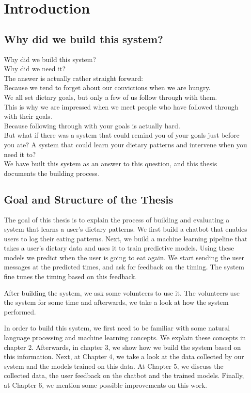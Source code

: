 
\chapter{Introduction}\label{chapter:introduction}

\section{Why did we build this system?}
Why did we build this system?\\ 
Why did we need it?\\
The answer is actually rather straight forward:\\
Because we tend to forget about our convictions when we are hungry.\\
We all set dietary goals, but only a few of us follow through with them.\\
This is why we are impressed when we meet people who have followed through with their goals.\\
Because following through with your goals is actually hard.\\
But what if there was a system that could remind you of your goals just before you ate?
A system that could learn your dietary patterns and intervene when you need it to?\\
We have built this system as an answer to this question, and this thesis documents the building process.

\section{Goal and Structure of the Thesis}
The goal of this thesis is to explain the process of building and evaluating a system that learns a user's dietary patterns.
We first build a chatbot that enables users to log their eating patterns.
Next, we build a machine learning pipeline that takes a user's dietary data and uses it to train predictive models.
Using these models we predict when the user is going to eat again.
We start sending the user messages at the predicted times, and ask for feedback on the timing.
The system fine tunes the timing based on this feedback.

After building the system, we ask some volunteers to use it.
The volunteers use the system for some time and afterwards, we take a look at how the system performed.

In order to build this system, we first need to be familiar with some natural language processing and machine learning concepts.
We explain these concepts in chapter 2.
Afterwards, in chapter 3, we show how we build the system based on this information.
Next, at Chapter 4, we take a look at the data collected by our system and the models trained on this data.
At Chapter 5, we discuss the collected data, the user feedback on the chatbot and the trained models.
Finally, at Chapter 6, we mention some possible improvements on this work.

